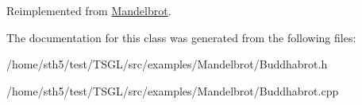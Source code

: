 Reimplemented from \hyperlink{class_mandelbrot_ab7918e4de8f00f73290f110ca7a6cffd}{Mandelbrot}.



The documentation for this class was generated from the following files\+:\begin{DoxyCompactItemize}
\item 
/home/sth5/test/\+T\+S\+G\+L/src/examples/\+Mandelbrot/Buddhabrot.\+h\item 
/home/sth5/test/\+T\+S\+G\+L/src/examples/\+Mandelbrot/Buddhabrot.\+cpp\end{DoxyCompactItemize}
